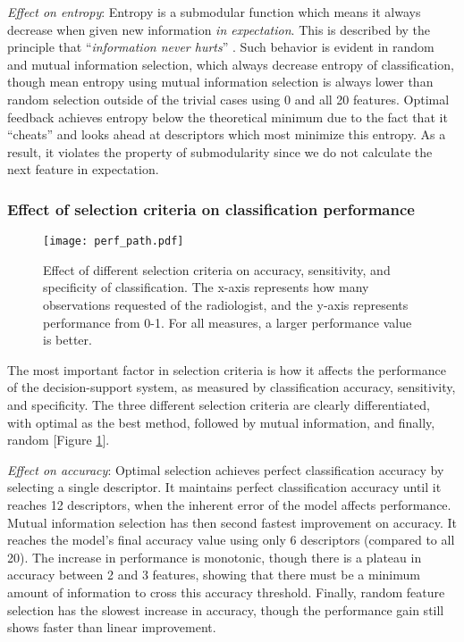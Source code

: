 \emph{Effect on entropy}:
Entropy is a submodular function which means it always decrease when given new information \emph{in expectation}. This is described by the principle that ``\emph{information never hurts}'' \cite{Nemhauser:1978ck,Krause:2005tr}. Such behavior is evident in random and mutual information selection, which always decrease entropy of classification, though mean entropy using mutual information selection is always lower than random selection outside of the trivial cases using 0 and all 20 features. Optimal feedback achieves entropy below the theoretical minimum due to the fact that it ``cheats'' and looks ahead at descriptors which most minimize this entropy. As a result, it violates the property of submodularity since we do not calculate the next feature in expectation.


 \subsubsection{Effect of selection criteria on classification performance}

 
 \begin{figure}[h]
 	\centering
 	\texttt{[image: perf\_path.pdf]}
 	\caption[Effect of selection criteria on classification performance]{Effect of different selection criteria on accuracy, sensitivity, and specificity of classification. The x-axis represents how many observations requested of the radiologist, and the y-axis represents performance from 0-1. For all measures, a larger performance value is better.}
 	\label{fig:feedback_performance}
 \end{figure}

The most important factor in selection criteria is how it affects the performance of the decision-support system, as measured by classification accuracy, sensitivity, and specificity. The three different selection criteria are clearly differentiated, with optimal as the best method, followed by mutual information, and finally, random [Figure \ref{fig:feedback_performance}].

\emph{Effect on accuracy}: 
Optimal selection achieves perfect classification accuracy by selecting a single descriptor. It maintains perfect classification accuracy until it reaches 12 descriptors, when the inherent error of the model affects performance. Mutual information selection has then second fastest improvement on accuracy. It reaches the model's final accuracy value using only 6 descriptors (compared to all 20). The increase in performance is monotonic, though there is a plateau in accuracy between 2 and 3 features, showing that there must be a minimum amount of information to cross this accuracy threshold. Finally, random feature selection has the slowest increase in accuracy, though the performance gain still shows faster than linear improvement.

